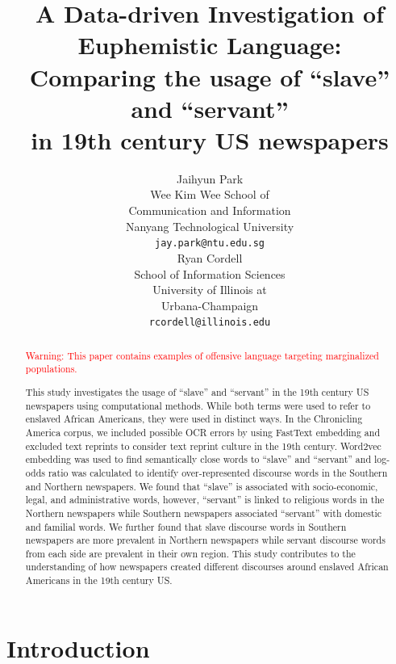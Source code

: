 \documentclass[11pt]{article}
\title{A Data-driven Investigation of Euphemistic Language: \\
Comparing the usage of “slave” and “servant” \\ 
in 19th century US newspapers}
\author{Jaihyun Park \\
  Wee Kim Wee School of \\
  Communication and Information \\
  Nanyang Technological University \\
  \texttt{jay.park@ntu.edu.sg} \\\And
  Ryan Cordell \\
  School of Information Sciences \\
  University of Illinois at \\
  Urbana-Champaign \\
  \texttt{rcordell@illinois.edu} \\}
\begin{document}
\maketitle
\begin{abstract}
\textcolor{red}{Warning: This paper contains examples of offensive language targeting marginalized populations.} 

This study investigates the usage of ``slave'' and ``servant'' in the 19th century US newspapers using computational methods. While both terms were used to refer to enslaved African Americans, they were used in distinct ways. In the Chronicling America corpus, we included possible OCR errors by using FastText embedding and excluded text reprints to consider text reprint culture in the 19th century. Word2vec embedding was used to find semantically close words to ``slave'' and ``servant'' and log-odds ratio was calculated to identify over-represented discourse words in the Southern and Northern newspapers. We found that ``slave'' is associated with socio-economic, legal, and administrative words, however, ``servant'' is linked to religious words in the Northern newspapers while Southern newspapers associated ``servant'' with domestic and familial words. We further found that slave discourse words in Southern newspapers are more prevalent in Northern newspapers while servant discourse words from each side are prevalent in their own region. This study contributes to the understanding of how newspapers created different discourses around enslaved African Americans in the 19th century US.

\end{abstract}

\section{Introduction}
\end{document}
